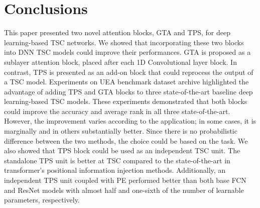 \documentclass[journal]{IEEEtran}
\begin{document}
\section{Conclusions}
This paper presented two novel attention blocks, GTA and TPS, for deep learning-based TSC networks. We showed that incorporating these two blocks into DNN TSC models could improve their performances. GTA is proposed as a sublayer attention block, placed after each 1D Convolutional layer block. In contrast, TPS is presented as an add-on block that could reprocess the output of a TSC model. Experiments on UEA benchmark dataset archive highlighted the advantage of adding TPS and GTA blocks to three state-of-the-art baseline deep learning-based TSC models. These experiments demonstrated that both blocks could improve the accuracy and average rank in all three state-of-the-art. However, the improvement varies according to the application; in some cases, it is marginally and in others substantially better. Since there is no probabilistic difference between the two methods, the choice could be based on the task. We also showed that TPS block could be used as an independent TSC unit. The standalone TPS unit is better at TSC compared to the state-of-the-art in transformer’s positional information injection methods. Additionally, an independent TPS unit coupled with PE performed better than both base FCN and ResNet models with almost half and one-sixth of the number of learnable parameters, respectively.



















































\ifCLASSOPTIONcaptionsoff
  \newpage
\fi







\printbibliography
\end{document}
